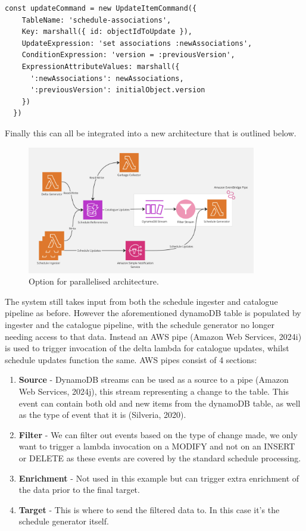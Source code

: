 \begin{lstlisting}[caption=SDK command sent to optimistically lock writes to the assocaitions column.]
  const updateCommand = new UpdateItemCommand({
    TableName: 'schedule-associations',
    Key: marshall({ id: objectIdToUpdate }),
    UpdateExpression: 'set associations :newAssociations',
    ConditionExpression: 'version = :previousVersion',
    ExpressionAttributeValues: marshall({ 
      ':newAssociations': newAssociations,
      ':previousVersion': initialObject.version 
    })
  })
  \end{lstlisting}

  Finally this can all be integrated into a new architecture that is outlined below.

  \begin{figure}[H]
    \centering
    \includegraphics[width=10cm]{assets/architectures/dynamo.png}
    \caption{Option for parallelised architecture.}
    \label{fig:dynamoArchitecture}
  \end{figure}

  The system still takes input from both the schedule ingester and catalogue pipeline as before. However the aforementioned dynamoDB table is populated 
  by ingester and the catalogue pipeline, with the schedule generator no longer needing access to that data. Instead an AWS pipe (Amazon Web Services, 2024i) 
  is used to trigger invocation of the delta lambda for catalogue updates, whilst schedule updates function the same. AWS pipes consist of 4 sections:

  \begin{enumerate}
    \item \textbf{Source} - DynamoDB streams can be used as a source to a pipe (Amazon Web Services, 2024j), this stream representing a change to the table.
    This event can contain both old and new items from the dynamoDB table, as well as the type of event that it is (Silveria, 2020).
    \item \textbf{Filter} - We can filter out events based on the type of change made, we only want to trigger a lambda invocation on a MODIFY and not 
    on an INSERT or DELETE as these events are covered by the standard schedule processing.
    \item \textbf{Enrichment} - Not used in this example but can trigger extra enrichment of the data prior to the final target.
    \item \textbf{Target} - This is where to send the filtered data to. In this case it's the schedule generator itself.
  \end{enumerate}

